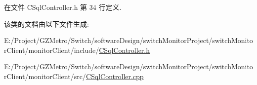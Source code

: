在文件 C\+Sql\+Controller.\+h 第 34 行定义.



该类的文档由以下文件生成\+:\begin{DoxyCompactItemize}
\item 
E\+:/\+Project/\+G\+Z\+Metro/\+Switch/software\+Design/switch\+Monitor\+Project/switch\+Monitor\+Client/monitor\+Client/include/\hyperlink{_c_sql_controller_8h}{C\+Sql\+Controller.\+h}\item 
E\+:/\+Project/\+G\+Z\+Metro/\+Switch/software\+Design/switch\+Monitor\+Project/switch\+Monitor\+Client/monitor\+Client/src/\hyperlink{_c_sql_controller_8cpp}{C\+Sql\+Controller.\+cpp}\end{DoxyCompactItemize}
